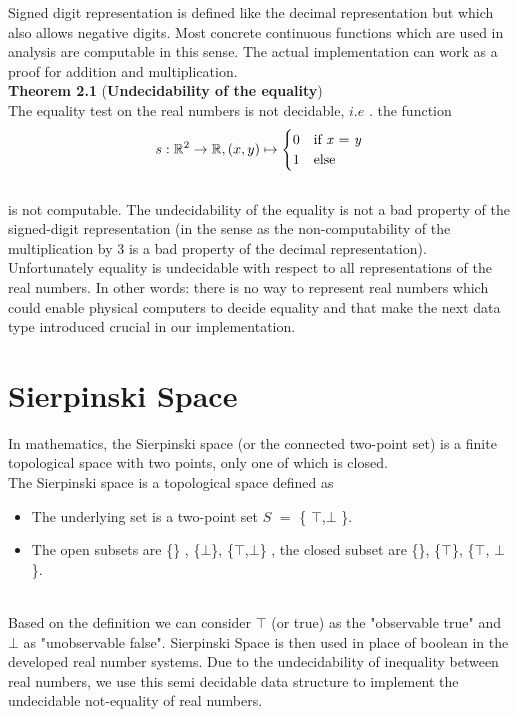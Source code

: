 \documentclass[12pt,twoside,notitlepage]{report}
\begin{document}
Signed digit representation is defined like the decimal representation but which also allows negative digits.  Most concrete continuous functions which are used in analysis are computable in this sense. The actual implementation can work as a proof for addition and multiplication.\\
\textbf{Theorem 2.1} (\textbf{Undecidability of the equality}) \\
The equality test on the real numbers is not decidable, $i.e$ . the function
\begin{equation}
s : \mathbb{R}^{2} \rightarrow \mathbb{R},
(x, y)\mapsto 
\begin{cases}
0& \text{if \textit{x} = \textit{y}}\\
1& \text{else}
\end{cases}
\end{equation}\\
is not computable\cite{peter}.
The undecidability of the equality is not a bad property of the signed-digit representation (in the sense as the non-computability of the multiplication by 3 is a bad property of the decimal representation). Unfortunately equality is undecidable with respect to all representations of the real numbers. In other words: there is no way to represent real numbers which could enable physical computers to decide equality and that make the next data type introduced crucial in our implementation.

\section {Sierpinski Space}
In mathematics, the Sierpinski space (or the connected two-point set) is a finite topological space with two points, only one of which is closed. \\
The Sierpinski space is a topological space defined as 
\begin{itemize}
\item The underlying set is a two-point set $\textit{S}$ $=$ \{ $\top$,$\bot$ \}. 
\item The open subsets are  \{\} , \{$\bot$\}, \{$\top$,$\bot$\} , the closed subset are \{\}, \{$\top$\}, \{$\top$, $\bot$\}.
\end{itemize}
~\\
Based on the definition we can consider $\top$ (or true) as the "observable true" and $\bot$ as "unobservable
false". 
Sierpinski Space is then used in place of boolean in the developed real number systems. Due to the undecidability of inequality between real numbers, we use this semi decidable data structure to implement the undecidable not-equality of real numbers.
\end{document}
